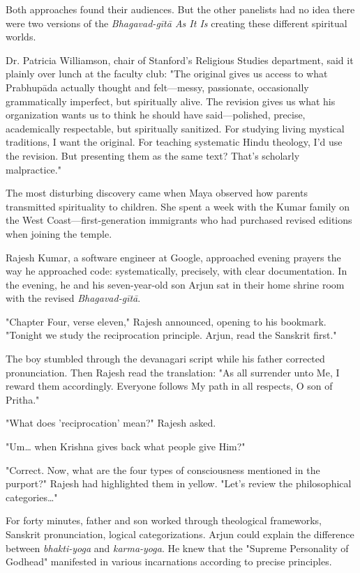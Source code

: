 \documentclass[12pt,twoside]{book}
\begin{document}
Both approaches found their audiences. But the other panelists had no idea there were two versions of the \emph{Bhagavad-gītā As It Is} creating these different spiritual worlds.

Dr. Patricia Williamson, chair of Stanford's Religious Studies department, said it plainly over lunch at the faculty club: "The original gives us access to what Prabhupāda actually thought and felt—messy, passionate, occasionally grammatically imperfect, but spiritually alive. The revision gives us what his organization wants us to think he should have said—polished, precise, academically respectable, but spiritually sanitized. For studying living mystical traditions, I want the original. For teaching systematic Hindu theology, I'd use the revision. But presenting them as the same text? That's scholarly malpractice."

The most disturbing discovery came when Maya observed how parents transmitted spirituality to children. She spent a week with the Kumar family on the West Coast—first-generation immigrants who had purchased revised editions when joining the temple.

Rajesh Kumar, a software engineer at Google, approached evening prayers the way he approached code: systematically, precisely, with clear documentation. In the evening, he and his seven-year-old son Arjun sat in their home shrine room with the revised \emph{Bhagavad-gītā}.

"Chapter Four, verse eleven," Rajesh announced, opening to his bookmark. "Tonight we study the reciprocation principle. Arjun, read the Sanskrit first."

The boy stumbled through the devanagari script while his father corrected pronunciation. Then Rajesh read the translation: "As all surrender unto Me, I reward them accordingly. Everyone follows My path in all respects, O son of Pritha."

"What does 'reciprocation' mean?" Rajesh asked.

"Um\ldots{} when Krishna gives back what people give Him?"

"Correct. Now, what are the four types of consciousness mentioned in the purport?" Rajesh had highlighted them in yellow. "Let's review the philosophical categories\ldots{}"

For forty minutes, father and son worked through theological frameworks, Sanskrit pronunciation, logical categorizations. Arjun could explain the difference between \emph{bhakti-yoga} and \emph{karma-yoga}. He knew that the "Supreme Personality of Godhead" manifested in various incarnations according to precise principles.
\end{document}
